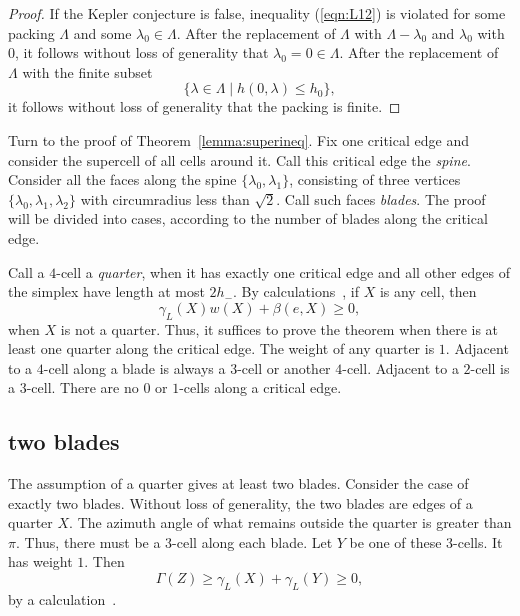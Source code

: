 \begin{proof} If the Kepler conjecture is false, inequality (\ref{eqn:L12}) is violated for some packing $\Lambda$ and some $\lambda_0\in\Lambda$.  After the replacement of $\Lambda$ with $\Lambda - \lambda_0$ and $\lambda_0$ with $0$, it follows without loss of generality that $\lambda_0=0\in\Lambda$.  After the replacement of $\Lambda$ with the finite subset
$$
\{\lambda\in\Lambda\mid h(0,\lambda)\le h_0\},
$$
it follows without loss of generality that the packing is finite.
\end{proof}


Turn to the proof of Theorem~\ref{lemma:superineq}. Fix one critical edge and consider the supercell of all cells around it.  Call this critical edge the {\it spine}.  Consider all the faces along the spine $\{\lambda_0,\lambda_1\}$, consisting of three vertices $\{\lambda_0,\lambda_1,\lambda_2\}$ with circumradius less than $\sqrt2$.  Call such faces {\it blades}.  The proof will be divided into cases, according to the number of blades along the critical edge.

Call a $4$-cell a {\it quarter}, when it has exactly one critical edge and all other edges of the simplex have length at most $2 h_-$. By calculations~\cite[cc:qtr:GLFVCVK]{hales:2009:nonlinear}, if $X$ is any cell, then %
$$
 \gamma_L(X) w(X) + \beta(e,X)\ge 0,
$$ 
when $X$ is not a quarter.  Thus, it
suffices to prove the theorem
when there is at least one quarter along the critical
edge.  The weight of any quarter is $1$.
Adjacent to a $4$-cell along a blade is always a $3$-cell or another $4$-cell. Adjacent to a $2$-cell is a $3$-cell.  There are no $0$ or $1$-cells along a critical edge.


\subsection{two blades}

The assumption of a quarter gives at least two blades.  Consider
the case of exactly two blades.
Without loss of generality, the two blades are edges of a quarter
$X$. 
The azimuth angle of what remains outside the quarter
is greater than $\pi$.  Thus, there must be a $3$-cell
along each blade.  Let $Y$ be one of these $3$-cells.
It has weight $1$.
Then 
\begin{equation}\label{eqn:34}
\Gamma(Z)\ge \gamma_L(X)+\gamma_L(Y)\ge 0,
\end{equation}
by a calculation~\cite[cc:2bl:FHBVYXZ]{hales:2009:nonlinear}. %




